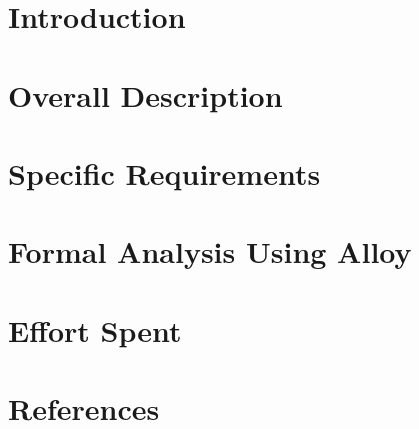\documentclass[fontsize=11pt,paper=a4,pagesize=auto]{report}
\begin{document}
\tableofcontents
\chapter{Introduction}



\chapter{Overall Description}



\chapter{Specific Requirements}





\chapter{Formal Analysis Using Alloy}



\chapter{Effort Spent}



\chapter{References}

\end{document}
